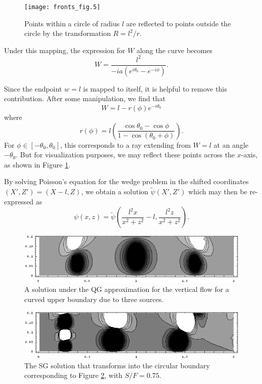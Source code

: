 \documentclass[11pt,onecolumn,oneside]{article}
\begin{document}
\begin{figure}[ht]
\centering
\texttt{[image: fronts\_fig.5]}
\caption{\small Points within a circle of radius $l$ are reflected to points outside the circle by the transformation $R = l^2/r$.}
\label{Fig:CircReflection}
\end{figure}

Under this mapping, the expression for $W$ along the curve becomes
\[
W = \frac{l^2}{-ia(e^{i\theta_0} - e^{-i\phi})}.
\]

Since the endpoint $w=l$ is mapped to itself, it is helpful to remove this contribution. After some manipulation, we find that
\[
W = l - r(\phi) e^{-i\theta_0}
\]
where
\[
r(\phi) = l \left(\frac{\cos \theta_0 - \cos \phi}{1-\cos (\theta_0 + \phi)} \right).
\]
For $\phi \in [-\theta_0, \theta_0]$, this corresponds to a ray extending from $W=l$ at an angle $-\theta_0$. But for visualization purposes, we may reflect these points across the $x$-axis, as shown in Figure \ref{Fig:CircReflection}.

By solving Poisson's equation for the wedge problem in the shifted coordinates $(X',Z') = (X-l,Z)$, we obtain a solution $\widetilde{\psi}(X',Z')$ which may then be re-expressed as
\[
\psi(x,z) = \widetilde{\psi}\left(\frac{l^2 x}{x^2+z^2} - l, \frac{l^2 z}{x^2 + z^2}\right).
\]

\begin{figure}
\centering
\includegraphics[width=4.9in]{img/qg_curve_n16_3src_mid.eps}
\caption{\small A solution under the QG approximation for the vertical flow for a curved upper boundary due to three sources.}
\label{Fig:QGCurvedFlow}
\end{figure}

\begin{figure}
\centering
\includegraphics[width=4.9in]{img/sg_curve_n16_s075_3src_mid.eps}
\caption{\small The SG solution that transforms into the circular boundary corresponding to Figure \ref{Fig:QGCurvedFlow}, with $S/F = 0.75$.}
\label{Fig:SGCurvedFlow}
\end{figure}
\end{document}
